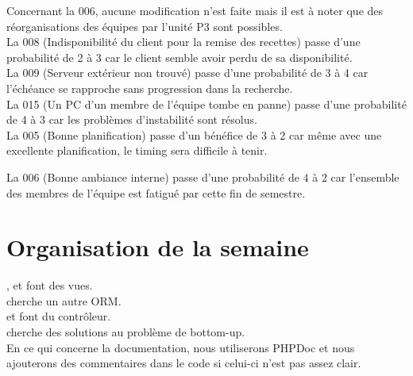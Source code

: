 \documentclass [a4paper] {article}
\begin{document}
Concernant la \FDR{} 006, aucune modification n'est faite mais il est à noter que des réorganisations des équipes par l'unité P3 sont possibles.\\

La \FDR{} 008 (Indisponibilité du client pour la remise des recettes) passe d'une probabilité de 2 à 3 car le client semble avoir perdu de sa disponibilité.\\

La \FDR{} 009 (Serveur extérieur non trouvé) passe d'une probabilité de 3 à 4 car l'échéance se rapproche sans progression dans la recherche.\\

La \FDR{} 015 (Un PC d’un membre de l’équipe tombe en panne) passe d'une probabilité de 4 à 3 car les problèmes d'instabilité sont résolus.\\

La \FDO{} 005 (Bonne planification) passe d'un bénéfice de 3 à 2 car même avec une excellente planification, le timing sera difficile à tenir.

La \FDO{} 006 (Bonne ambiance interne) passe d'une probabilité de 4 à 2 car l'ensemble des membres de l'équipe est fatigué par cette fin de semestre.



\section{Organisation de la semaine}
\Matthieu, \Julie{} et \Mathieu{} font des vues.\\
\Melissa{} cherche un autre ORM.\\
\Florian{} et \Kafui{} font du contrôleur.\\
\Michel{} cherche des solutions au problème de bottom-up.\\

En ce qui concerne la documentation, nous utiliserons PHPDoc et nous ajouterons des commentaires dans le code si celui-ci n'est pas assez clair.



\end{document}
